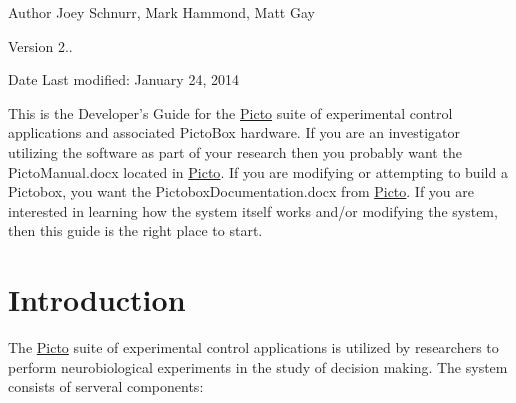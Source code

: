 \begin{DoxyAuthor}{Author}
Joey Schnurr, Mark Hammond, Matt Gay 
\end{DoxyAuthor}
\begin{DoxyVersion}{Version}
2.. 
\end{DoxyVersion}
\begin{DoxyDate}{Date}
Last modified\-: January 24, 2014
\end{DoxyDate}
This is the Developer's Guide for the \hyperlink{namespace_picto}{Picto} suite of experimental control applications and associated Picto\-Box hardware. If you are an investigator utilizing the software as part of your research then you probably want the Picto\-Manual.\-docx located in \hyperlink{namespace_picto}{Picto}. If you are modifying or attempting to build a Pictobox, you want the Pictobox\-Documentation.\-docx from \hyperlink{namespace_picto}{Picto}. If you are interested in learning how the system itself works and/or modifying the system, then this guide is the right place to start.\hypertarget{index_devdocs_getting_started_introduction}{}\section{Introduction}\label{index_devdocs_getting_started_introduction}
The \hyperlink{namespace_picto}{Picto} suite of experimental control applications is utilized by researchers to perform neurobiological experiments in the study of decision making. The system consists of serveral components\-:
